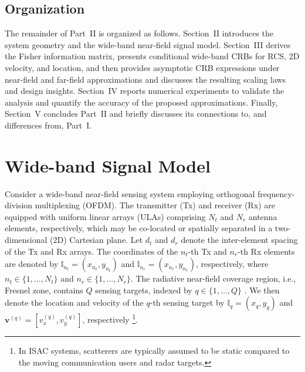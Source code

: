 \documentclass[9pt,final,journal,twocolumn]{IEEEtran}
\begin{document}
\vspace{-0.2cm}
\subsection{Organization}
\vspace{-0.1cm}
The remainder of Part~II is organized as follows. Section~II introduces the system geometry and the wide-band near-field signal model. Section~III derives the Fisher information matrix, presents conditional wide-band CRBs for RCS, 2D velocity, and  location, and then provides asymptotic CRB expressions under near-field and far-field approximations and discusses the resulting scaling laws and design insights. Section~IV reports numerical experiments to validate the analysis and quantify the accuracy of the proposed approximations. Finally, Section~V concludes Part~II and briefly discusses its connections to, and differences from, Part~I.
 



\section{Wide-band Signal Model}
Consider a wide-band near-field sensing system employing orthogonal frequency-division multiplexing (OFDM). The transmitter (Tx) and receiver (Rx) are equipped with uniform linear arrays (ULAs) comprising $N_t$ and $N_r$ antenna elements, respectively, which may be co-located or spatially separated in a two-dimensional (2D) Cartesian plane. Let $d_t$ and $d_r$ denote the inter-element spacing of the Tx and Rx arrays. The coordinates of the $n_t$-th Tx and $n_r$-th Rx elements are denoted by ${\mathbb I}_{n_t}=(x_{n_t},y_{n_t})$ and ${\mathbb I}_{n_r}=(x_{n_r},y_{n_r})$, respectively, where $n_t\in\{1,\ldots,N_t\}$ and $n_r\in\{1,\ldots,N_r\}$. The radiative near-field coverage region, i.e., Fresnel zone, \cite{liu2023near-field} contains $Q$ sensing targets, indexed by $q\in\{1,\ldots,Q\}$ \cite{hu2024joint,hu2025high}. We then denote the location and velocity of the $q$-th sensing target by ${\mathbb I}_{q}=(x_{q},y_{q})$ and ${\bm v}^{(q)}=[v_x^{(q)},v_y^{(q)}]$, respectively \cite{sun2024widely}\footnote{In ISAC systems, scatterers are typically assumed to be static compared to the moving communication users and radar targets\cite{elbir2024terahertz,mishra2019toward}.}.
\end{document}
